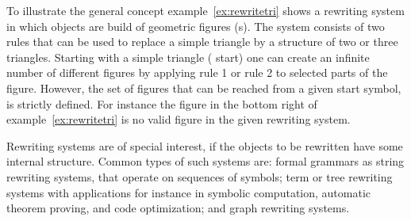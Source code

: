 To illustrate the general concept example~\ref{ex:rewritetri} shows a rewriting
system in which objects are build of geometric figures (s).
The system consists of two rules that can be used to replace a simple triangle
by a structure of two or three triangles. Starting with a simple triangle ({\sf
start}) one can create an infinite number of different figures by applying {\sf
rule 1} or {\sf rule 2} to selected parts of the figure. However, the set of
figures that can be reached from a given start symbol, is strictly defined. For
instance the figure in the bottom right of example~\ref{ex:rewritetri} is no
valid figure in the given rewriting system.

Rewriting systems are of special interest, if the objects to be rewritten 
have some internal structure. Common types of such systems are: formal grammars
as string rewriting systems, that operate on sequences of symbols; term or tree
rewriting systems with applications for instance in symbolic computation,
automatic theorem proving, and code optimization; and graph rewriting systems.

